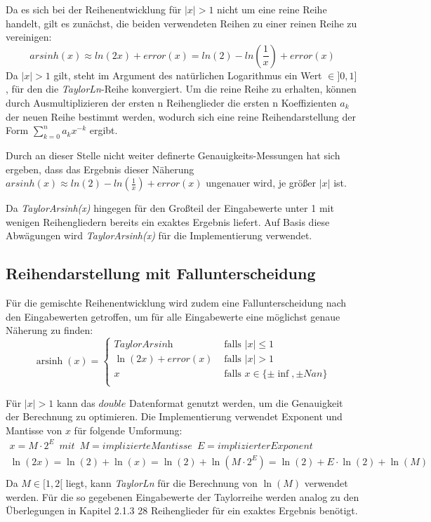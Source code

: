 \documentclass[course=erap] {aspdoc}
\begin{document}
    Da es sich bei der Reihenentwicklung für $|x|>1$ nicht um eine reine Reihe handelt, gilt es zunächst, die beiden verwendeten Reihen zu einer reinen Reihe zu vereinigen:
    \[
        arsinh(x)\approx ln(2x) + error(x) = ln(2) - ln(\frac{1}{x}) + error(x)
    \]
    Da $|x|>1$ gilt, steht im Argument des natürlichen Logarithmus ein Wert $\in ]0, 1]$, für den die \textit{TaylorLn}-Reihe konvergiert.
    Um die reine Reihe zu erhalten, können durch Ausmultiplizieren der ersten n Reihenglieder die ersten n Koeffizienten $a_k$ der neuen Reihe bestimmt werden, wodurch sich eine reine Reihendarstellung der Form $\sum_{k=0}^{n} a_k x^{-k}$ ergibt.

    Durch an dieser Stelle nicht weiter definerte Genauigkeits-Messungen hat sich ergeben, dass das Ergebnis dieser Näherung $ arsinh(x)\approx ln(2) - ln(\frac{1}{x}) + error(x)$ ungenauer wird, je größer $|x|$ ist.

    Da \textit{TaylorArsinh(x)} hingegen für den Großteil der Eingabewerte unter 1 mit wenigen Reihengliedern bereits ein exaktes Ergebnis liefert.
    Auf Basis diese Abwägungen wird \textit{TaylorArsinh(x)} für die Implementierung verwendet.


    \subsection{Reihendarstellung mit Fallunterscheidung}\label{subsec:reihendarstellung-mit-fallunterscheidung}

    Für die gemischte Reihenentwicklung wird zudem eine Fallunterscheidung nach den Eingabewerten getroffen, um für alle Eingabewerte eine möglichst genaue Näherung zu finden:
    \[ \operatorname{arsinh}(x) =
    \begin{cases}
        \textit{TaylorArsinh}     & \text{ falls } |x| \leq 1 \\
        \ln(2x) + error(x)  & \text{ falls } |x| >1 \\
        x     & \text{ falls } x \in \{\pm\inf, \pm Nan\}\\
    \end{cases}\]

    Für $|x|>1$ kann das $double$ Datenformat genutzt werden, um die Genauigkeit der Berechnung zu optimieren.
    Die Implementierung verwendet Exponent und Mantisse von $x$ für folgende Umformung:
    \begin{gather*}
        x = M\cdot2^E \,\,\, mit \,\,\, M = implizierte Mantisse \,\,\, E = implizierter Exponent\\
        \ln(2x) = \ln(2) + \ln(x) = \ln(2) + \ln(M\cdot2^E) = \ln(2) + E\cdot\ln(2) + \ln(M)\\
    \end{gather*}
    Da $M\in[1, 2[$ liegt, kann \textit{TaylorLn} für die Berechnung von $\ln(M)$ verwendet werden.
    Für die so gegebenen Eingabewerte der Taylorreihe werden analog zu den Überlegungen in Kapitel 2.1.3 28 Reihenglieder für ein exaktes Ergebnis benötigt.
\end{document}
